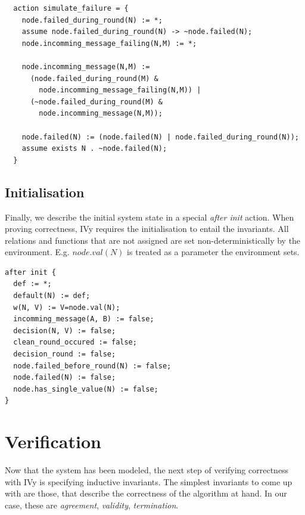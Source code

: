\documentclass[fleqn]{article}
\begin{document}
\begin{mdframed}[backgroundcolor=light-gray, roundcorner=10pt,leftmargin=1, rightmargin=1, innerleftmargin=15, innertopmargin=15,innerbottommargin=15, outerlinewidth=1, linecolor=light-gray]
\begin{lstlisting}
  action simulate_failure = {
    node.failed_during_round(N) := *;
    assume node.failed_during_round(N) -> ~node.failed(N);
    node.incomming_message_failing(N,M) := *;

    node.incomming_message(N,M) :=
      (node.failed_during_round(M) &
        node.incomming_message_failing(N,M)) |
      (~node.failed_during_round(M) &
        node.incomming_message(N,M));

    node.failed(N) := (node.failed(N) | node.failed_during_round(N));
    assume exists N . ~node.failed(N);
  }
\end{lstlisting}
\end{mdframed}

\subsection{Initialisation}

Finally, we describe the initial system state in a special \textit{after init} action. When
proving correctness, IVy requires the initialisation to entail the invariants. All relations and functions
that are not assigned are set non-deterministically by the environment. E.g. $node.val(N)$ is
treated as a parameter the environment sets.

\begin{mdframed}[backgroundcolor=light-gray, roundcorner=10pt,leftmargin=1, rightmargin=1, innerleftmargin=15, innertopmargin=15,innerbottommargin=15, outerlinewidth=1, linecolor=light-gray]
\begin{lstlisting}
after init {
  def := *;
  default(N) := def;
  w(N, V) := V=node.val(N);
  incomming_message(A, B) := false;
  decision(N, V) := false;
  clean_round_occured := false;
  decision_round := false;
  node.failed_before_round(N) := false;
  node.failed(N) := false;
  node.has_single_value(N) := false;
}
\end{lstlisting}
\end{mdframed}

\section{Verification}

Now that the system has been modeled, the next step of verifying correctness with IVy is specifying inductive invariants. The simplest invariants to come up with are those, that describe the correctness of the algorithm at hand. In our case, these are \textit{agreement}, \textit{validity}, \textit{termination}.
\end{document}
